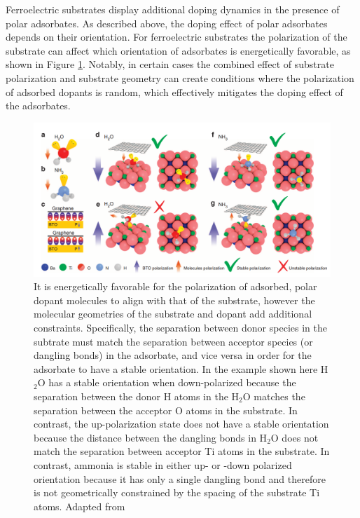 \documentclass[edeposit,fullpage,draftthesis]{uiucthesis2009}
\begin{document}
        Ferroelectric substrates display additional doping dynamics in the presence of polar adsorbates.
        As described above, the doping effect of polar adsorbates depends on their orientation. 
        For ferroelectric substrates the polarization of the substrate can affect which orientation
        of adsorbates is energetically favorable, as shown in Figure \ref{fig:polar_ferro}. Notably,
        in certain cases the combined effect of substrate polarization and substrate geometry can
        create conditions where the polarization of adsorbed dopants is random, which effectively 
        mitigates the doping effect of the adsorbates.
         
            \begin{figure}
            \centering
            \includegraphics[width=\textwidth]{images/background/ferro_polar_doping.png}
            \caption[Dynamics of polar dopants on ferroelectric substrates]{
            It is energetically favorable for the polarization of adsorbed, polar dopant molecules to align with
            that of the substrate, however the molecular geometries of the substrate and dopant add
            additional constraints. Specifically, the separation between donor species in the subtrate
            must match the separation between acceptor species (or dangling bonds) in the adsorbate, and
            vice versa in order for the adsorbate to have a stable orientation. In the example shown here
            H$_2$O has a stable orientation when down-polarized because the separation between the donor H atoms in
            the H$_2$O matches the separation between the acceptor O atoms in the substrate. In contrast,
            the up-polarization state does not have a stable orientation because the distance between the
            dangling bonds in H$_2$O does not match the separation between acceptor Ti atoms in the substrate.
            In contrast, ammonia is stable in either up- or -down polarized orientation because it has only
            a single dangling bond and therefore is not geometrically constrained by the spacing of the substrate Ti atoms.
            Adapted from \cite{Lu2014}
            }
            \label{fig:polar_ferro}
            \end{figure}
 
\end{document}
